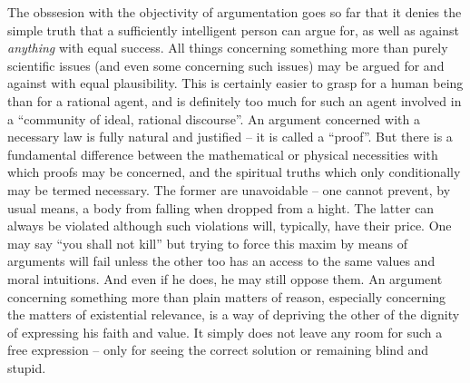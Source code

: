 The obssesion
with the objectivity of argumentation goes so far that it denies the simple
truth that a sufficiently intelligent person can argue for, as well as against
{\em anything} with equal success. All things concerning something more than
purely scientific issues (and even some concerning such issues) may be argued
for and against with equal plausibility. This is certainly easier to grasp for
a human being than for a rational agent, and is definitely too much for such
an agent involved in a ``community of ideal, rational discourse''.
An argument concerned with a necessary law is fully natural and justified --
it is called a ``proof''. But there is a fundamental difference between the
mathematical or physical necessities with which proofs may be concerned, and
the spiritual truths which only conditionally may be termed necessary. The former
are unavoidable -- one cannot prevent, by usual means, a body from falling when 
dropped from a hight. The latter can always be violated although such violations
will, typically, have their price. One may say ``you shall not kill'' but 
trying to force this maxim by means of arguments will fail unless the other too
has an access to the same values and moral intuitions. And even if he does, he
may still oppose them.
An argument concerning something more than plain matters of reason, especially
concerning the matters of existential relevance, is a way of depriving the
other of the dignity of expressing his faith and value.
It simply does not leave any room for such a free expression
 -- only for seeing the correct solution or remaining blind and stupid.

